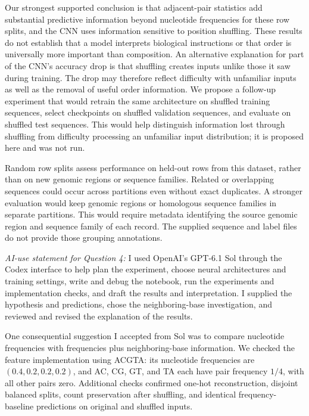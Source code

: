 \documentclass[12pt]{article}
\begin{document}
\begin{enumerate}
\begin{enumerate}[label=\textbf{\Alph*.}, leftmargin=*]
       Our strongest supported conclusion is that adjacent-pair statistics
       add substantial predictive information beyond nucleotide frequencies
       for these row splits, and the CNN uses information sensitive to
       position shuffling. These results do not establish that a model
       interprets biological instructions or that order is universally
       more important than composition. An alternative explanation for
       part of the CNN's accuracy drop is that shuffling creates inputs
       unlike those it saw during training. The drop may therefore reflect
       difficulty with unfamiliar inputs as well as the removal of useful
       order information. We propose a follow-up experiment that would
       retrain the same architecture on shuffled training sequences,
       select checkpoints on shuffled validation sequences, and evaluate
       on shuffled test sequences. This would help distinguish information
       lost through shuffling from difficulty processing an unfamiliar
       input distribution; it is proposed here and was not run.

       Random row splits assess performance on held-out rows from this
       dataset, rather than on new genomic regions or sequence families.
       Related or overlapping sequences could occur across partitions
       even without exact duplicates. A stronger evaluation would keep
       genomic regions or homologous sequence families in separate
       partitions. This would require metadata identifying the source
       genomic region and sequence family of each record. The supplied
       sequence and label files do not provide those grouping annotations.

       \noindent\textit{AI-use statement for Question 4:}
       I used OpenAI's GPT-6.1 Sol through the Codex interface to help plan
       the experiment, choose neural
       architectures and training settings, write and debug the notebook,
       run the experiments and implementation checks, and draft the
       results and interpretation. I supplied the hypothesis and
       predictions, chose the neighboring-base investigation, and
       reviewed and revised the explanation of the results.

       One consequential suggestion I accepted from Sol was to compare nucleotide
       frequencies with frequencies plus neighboring-base information.
       We checked the feature implementation using ACGTA: its nucleotide
       frequencies are $(0.4,0.2,0.2,0.2)$, and AC, CG, GT, and TA each
       have pair frequency $1/4$, with all other pairs zero.
       Additional checks confirmed one-hot reconstruction, disjoint
       balanced splits, count preservation after shuffling, and identical
       frequency-baseline predictions on original and shuffled inputs.
   \end{enumerate}


\end{enumerate}
\end{document}
